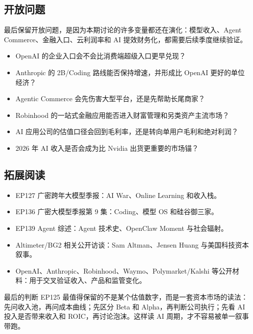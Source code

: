 \documentclass[a4paper]{article}
\begin{document}
\subsection{开放问题}

最后保留开放问题，是因为本期讨论的许多变量都还在演化：模型收入、Agent Commerce、金融入口、云利润率和 AI 提效财务化，都需要后续季度继续验证。

\begin{itemize}
\item OpenAI 的企业入口会不会比消费端超级入口更早兑现？
\item Anthropic 的 2B/Coding 路线能否保持增速，并形成比 OpenAI 更好的单位经济？
\item Agentic Commerce 会先伤害大型平台，还是先帮助长尾商家？
\item Robinhood 的一站式金融应用能否进入财富管理和另类资产主流市场？
\item AI 应用公司的估值口径会回到毛利率，还是转向单用户毛利和绝对利润？
\item 2026 年 AI 收入是否会成为比 Nvidia 出货更重要的市场锚？
\end{itemize}

\subsection{拓展阅读}

\begin{itemize}
\item EP127 广密跨年大模型季报：AI War、Online Learning 和收入栈。
\item EP136 广密大模型季报第 9 集：Coding、模型 OS 和硅谷御三家。
\item EP139 Agent 综述：Agent 技术史、OpenClaw Moment 与社会辐射。
\item Altimeter/BG2 相关公开访谈：Sam Altman、Jensen Huang 与美国科技资本叙事。
\item OpenAI、Anthropic、Robinhood、Waymo、Polymarket/Kalshi 等公开材料：用于交叉验证收入、产品和监管变化。
\end{itemize}

\begin{importantbox}{最后的判断}
EP125 最值得保留的不是某个估值数字，而是一套资本市场的读法：先问收入池，再问成本曲线；先区分 Beta 和 Alpha，再判断公司执行；先看 AI 投入是否带来收入和 ROIC，再讨论泡沫。这样读 AI 周期，才不容易被单一叙事带跑。
\end{importantbox}
\end{document}
